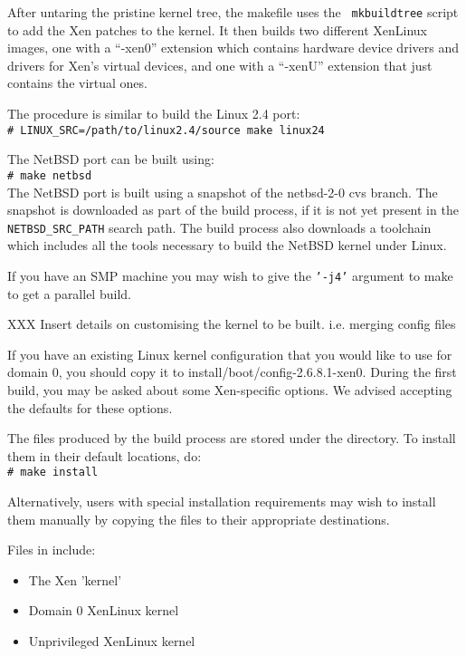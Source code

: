 \documentclass[11pt,twoside,final,openright]{xenstyle}
\begin{document}
After untaring the pristine kernel tree, the makefile uses the {\tt
mkbuildtree} script to add the Xen patches to the kernel.  It then
builds two different XenLinux images, one with a ``-xen0'' extension
which contains hardware device drivers and drivers for Xen's virtual
devices, and one with a ``-xenU'' extension that just contains the
virtual ones.

The procedure is similar to build the Linux 2.4 port: \\
\verb!# LINUX_SRC=/path/to/linux2.4/source make linux24!

The NetBSD port can be built using: \\ \verb!# make netbsd! \\ The
NetBSD port is built using a snapshot of the netbsd-2-0 cvs branch.
The snapshot is downloaded as part of the build process, if it is not
yet present in the {\tt NETBSD_SRC_PATH} search path.  The build
process also downloads a toolchain which includes all the tools
necessary to build the NetBSD kernel under Linux.

If you have an SMP machine you may wish to give the {\tt '-j4'}
argument to make to get a parallel build.

XXX Insert details on customising the kernel to be built.
i.e. merging config files

If you have an existing Linux kernel configuration that you would like
to use for domain 0, you should copy it to
install/boot/config-2.6.8.1-xen0.  During the first build, you may be
asked about some Xen-specific options.  We advised accepting the
defaults for these options.


The files produced by the build process are stored under the
 directory.  To install them in their default
locations, do: \\
\verb_# make install_

Alternatively, users with special installation requirements may wish
to install them manually by copying the files to their appropriate
destinations.

Files in  include:
\begin{itemize}
\item {} The Xen 'kernel'
\item {}  Domain 0 XenLinux kernel
\item {}  Unprivileged XenLinux kernel
\end{itemize}
\end{document}
